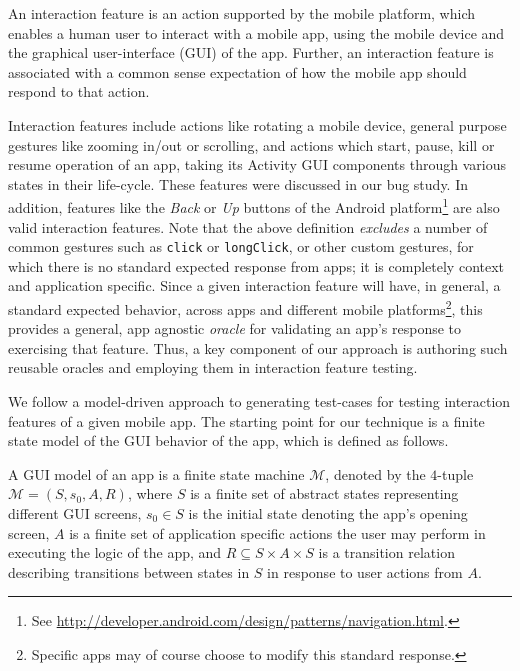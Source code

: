 
\begin{mydef}
\label{def:interactionFeature}
An interaction feature is an action supported by the mobile platform, which enables a human user to interact with a mobile app, using the mobile device and the graphical user-interface (GUI) of the app. Further, an interaction feature is associated with a common sense expectation of how the mobile app should respond to that action. 
\end{mydef}

Interaction features include actions like rotating a mobile device, general purpose gestures like zooming in/out or scrolling, and actions which start, pause, kill or resume operation of an app, taking its Activity GUI components through various states in their life-cycle. These features were discussed in our bug study. In addition, features like the \textit{Back} or \textit{Up} buttons of the Android platform\footnote{See \url{http://developer.android.com/design/patterns/navigation.html}.} are also valid interaction features. Note that the above definition \textit{excludes} a number of common gestures such as {\small\texttt{click}} or {\small\texttt{longClick}}, or other custom gestures, for which there is no standard expected response from apps; it is completely context and application specific. Since a given interaction feature will have, in general, a standard expected behavior, across apps and different mobile platforms\footnote{Specific apps may of course choose to modify this standard response.}, this provides a general, app agnostic \textit{oracle} for validating an app's response to exercising that feature. Thus, a key component of our approach is authoring such reusable oracles and employing them in interaction feature testing.

We follow a model-driven approach to generating test-cases for testing interaction features of a given mobile app. The starting point for our technique is a finite state model of the GUI behavior of the app, which is defined as follows.

\begin{mydef}
\label{def:GUImodel}
A GUI model of an app is a finite state machine $\mathcal{M}$, denoted by the $4$-tuple $\mathcal{M} = (S, s_0, A, R)$, where $S$ is a finite set of abstract states representing different GUI screens, $s_0 \in S$ is the initial state denoting the app's opening screen, $A$ is a finite set of application specific actions the user may perform in executing the logic of the app, and $R \subseteq S \times A \times S$ is a transition relation describing transitions between states in $S$ in response to user actions from $A$.  
\end{mydef} 


